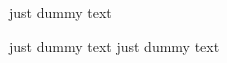 \documentclass{article}
\newcommand{\mylipsum}{just dummy text}
\newcommand{\Mylipsum}{\mylipsum{} \mylipsum}
\begin{document}
\mylipsum

\Mylipsum
\end{document}
